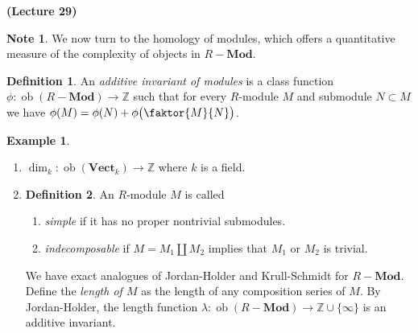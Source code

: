 \documentclass[10pt,letterpaper,cm]{nupset}
\theoremstyle{definition}
\newtheorem*{definition}{Definition}
\newtheorem{exmp}{Example}
\newtheorem{note}{Note}
\newcommand{\Z}{\mathbb Z}
\newcommand{\1}{\mathbf{1}}
\newcommand{\0}{\vec 0}
\DeclareMathOperator{\ob}{ob}
\begin{document}
\begin{center}
{\textbf{(Lecture 29)}}
\end{center}

\begin{note}
We now turn to the homology of modules, which offers a quantitative measure of the complexity of objects in $R{-}\mathbf{Mod}$.
\end{note}

\begin{definition}
An \textit{additive invariant of modules} is a class function $\phi : \ob(R{-} \mathbf{Mod}) \to \Z$ such that for every $R$-module $M$ and submodule $N\subset M$ we have $\phi(M) = \phi(N) + \phi \big(\faktor{M}{N} \big)$. 
\end{definition}

\begin{exmp} $ $
\begin{enumerate}
\item $\dim_k : \ob(\mathbf{Vect}_k) \to \Z$ where $k$ is a field.
\item  \begin{definition} An $R$-module $M$ is called
\begin{enumerate}
\item \textit{simple} if it has no proper nontrivial submodules.
\item \textit{indecomposable} if $M = M_1 \coprod M_2$ implies that $M_1$ or $M_2$ is trivial.
\end{enumerate}
We have exact analogues of Jordan-Holder and Krull-Schmidt for $R{-}\mathbf{Mod}$. Define the \textit{length of $M$} as the length of any composition series of $M$. By Jordan-Holder, the length function $\lambda : \ob(R{-} \mathbf{Mod}) \to \Z \cup \{\infty\}$ is an additive invariant.
\end{definition}
\end{enumerate}
\end{exmp}
\end{document}

